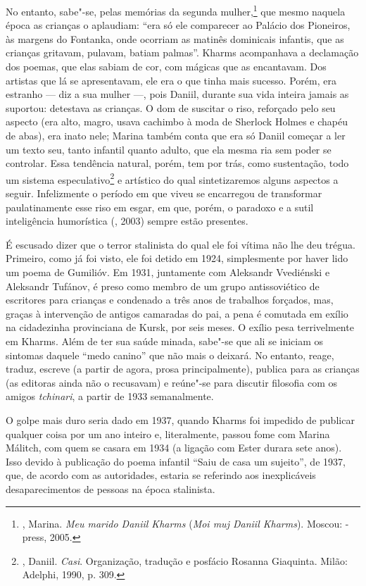 No entanto, sabe"-se, pelas memórias da segunda mulher,\footnote{, Marina. \emph{Meu marido Daniil Kharms} (\emph{Moi muj Daniil Kharms}). Moscou: -press, 2005.} que mesmo naquela época as crianças o aplaudiam: ``era só ele comparecer ao Palácio dos Pioneiros, às margens do Fontanka, onde ocorriam as matinês dominicais infantis, que as crianças gritavam, pulavam, batiam palmas''. Kharms acompanhava a declamação dos poemas, que elas sabiam de cor, com mágicas que as encantavam. Dos artistas que lá se apresentavam, ele era o que tinha mais sucesso. Porém, era estranho --- diz a sua mulher ---, pois Daniil, durante sua vida inteira jamais as suportou: detestava as crianças. O dom de suscitar o riso, reforçado pelo seu aspecto (era alto, magro, usava cachimbo à moda de Sherlock Holmes e chapéu de abas), era inato nele; Marina também conta que era só Daniil começar a ler um texto seu, tanto infantil quanto adulto, que ela mesma ria sem poder se controlar. Essa tendência natural, porém, tem por trás, como sustentação, todo um sistema especulativo\footnote{, Daniil. \emph{Casi}. Organização, tradução e posfácio Rosanna Giaquinta. Milão: Adelphi, 1990, p. 309.} e artístico do qual sintetizaremos alguns aspectos a seguir. Infelizmente o período em que viveu se encarregou de transformar paulatinamente esse riso em esgar, em que, porém, o paradoxo e a sutil inteligência humorística (, 2003) sempre estão presentes.

É escusado dizer que o terror stalinista do qual ele foi vítima
não lhe deu trégua. Primeiro, como já foi visto, ele foi detido em
1924, simplesmente por haver lido um poema de Gumilióv. Em 1931,
juntamente com Aleksandr Vvediénski e Aleksandr Tufánov, é preso
como membro de um grupo antissoviético de escritores para crianças
e condenado a três anos de trabalhos forçados, mas, graças à
intervenção de antigos camaradas do pai, a pena é comutada em
exílio na cidadezinha provinciana de Kursk, por seis meses. O
exílio pesa terrivelmente em Kharms. Além de ter sua saúde minada,
sabe"-se que ali se iniciam os sintomas daquele ``medo canino'' que
não mais o deixará. No entanto, reage, traduz, escreve (a partir de
agora, prosa principalmente), publica para as crianças (as editoras
ainda não o recusavam) e reúne"-se para discutir filosofia com os
amigos \emph{tchinari}, a partir de 1933 semanalmente.

O golpe mais duro seria dado em 1937, quando Kharms foi impedido de publicar qualquer coisa por um ano inteiro e, literalmente, passou fome com Marina Málitch, com quem se casara em 1934 (a ligação com Ester durara sete anos). Isso devido à publicação do poema infantil ``Saiu de casa um sujeito'', de 1937, que, de acordo com as autoridades, estaria se referindo aos inexplicáveis desaparecimentos de pessoas na época stalinista. 

